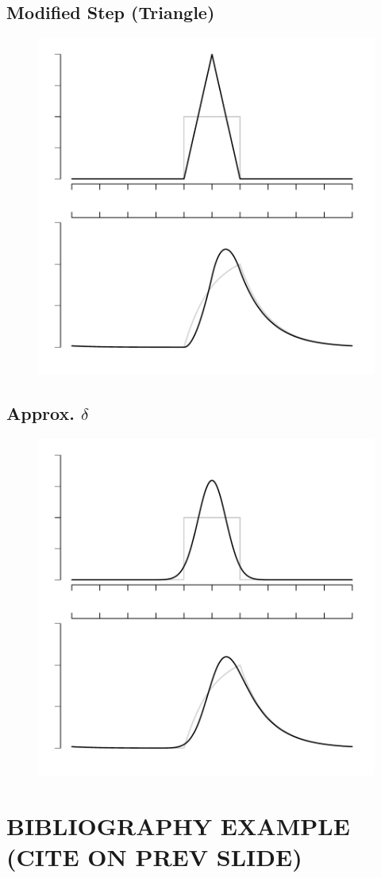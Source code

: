 \documentclass{article}
\begin{document}
\subsection{Modified Step (Triangle)}
\begin{figure}
\begin{center}
\includegraphics{synthetic-donations-pstri}
\end{center}
\end{figure}

\subsection{Approx. $\delta$}
\begin{figure}
\begin{center}
\includegraphics{synthetic-donations-psdel}
\end{center}
\end{figure}

\section{BIBLIOGRAPHY EXAMPLE (CITE ON PREV SLIDE)}
{}

\end{document}
